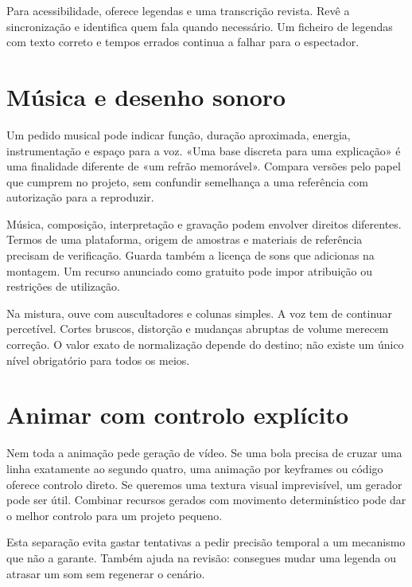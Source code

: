 Para acessibilidade, oferece legendas e uma transcrição revista. Revê a sincronização e identifica quem fala quando necessário. Um ficheiro de legendas com texto correto e tempos errados continua a falhar para o espectador.

\section{Música e desenho sonoro}
Um pedido musical pode indicar função, duração aproximada, energia, instrumentação e espaço para a voz. «Uma base discreta para uma explicação» é uma finalidade diferente de «um refrão memorável». Compara versões pelo papel que cumprem no projeto, sem confundir semelhança a uma referência com autorização para a reproduzir.

Música, composição, interpretação e gravação podem envolver direitos diferentes. Termos de uma plataforma, origem de amostras e materiais de referência precisam de verificação. Guarda também a licença de sons que adicionas na montagem. Um recurso anunciado como gratuito pode impor atribuição ou restrições de utilização.

Na mistura, ouve com auscultadores e colunas simples. A voz tem de continuar percetível. Cortes bruscos, distorção e mudanças abruptas de volume merecem correção. O valor exato de normalização depende do destino; não existe um único nível obrigatório para todos os meios.

\section{Animar com controlo explícito}
Nem toda a animação pede geração de vídeo. Se uma bola precisa de cruzar uma linha exatamente ao segundo quatro, uma animação por keyframes ou código oferece controlo direto. Se queremos uma textura visual imprevisível, um gerador pode ser útil. Combinar recursos gerados com movimento determinístico pode dar o melhor controlo para um projeto pequeno.

Esta separação evita gastar tentativas a pedir precisão temporal a um mecanismo que não a garante. Também ajuda na revisão: consegues mudar uma legenda ou atrasar um som sem regenerar o cenário.

